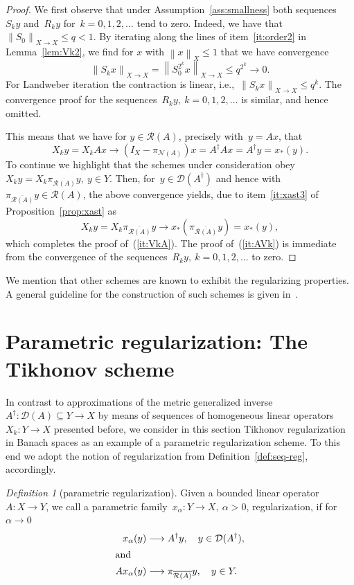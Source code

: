 \documentclass[12pt]{amsart}
\newcommand{\norm}[2]{\left\|#1\right\|_{#2}}
\newcommand{\lr}[1]{\left(#1\right)}
\newcommand{\domain}{\mathcal D}
\newcommand{\range}{\mathcal R}
\newcommand{\N}{\mathcal N}
\newcommand{\Ad}{A^\dag}
\newcommand{\xast}{x_\ast}
\newcommand{\pr}{\pi_{\overline{\range(A)}}}
\theoremstyle{remark}
\newtheorem{definition}{Definition}
\begin{document}
\begin{proof}
   We first observe that under Assumption~\ref{ass:smallness} both
  sequences~$S_{k}y$ and~$R_{k}y$ for~$k=0,1,2,\dots$ tend to zero.
  Indeed, we have that \linebreak $\norm{S_{0}}{X \to
   X}\leq q < 1$. By iterating along the lines of item~\eqref{it:order2} in Lemma~\ref{lem:Vk2}, we find for $x$ with $\norm{x}{X}\leq 1$ that we have convergence
 $$
\norm{S_{k}x}{X \to X} = \norm{S_{0}^{2^{k}}x}{X \to X}\leq q^{2
  ^{k}}\to 0.
$$
For Landweber iteration the contraction is linear, i.e.,\
$\norm{S_{k}x}{X \to X} \leq q^{k}$.
The convergence proof for the sequences~$R_{k}y,\ k=0,1,2,\dots$ is similar, and hence omitted.

\par

  This means that we have for $y\in\range(A)$, precisely with~$y=Ax$, that
  $$
  X_{k}y = X_{k}A x \longrightarrow \lr{I_{X} - \pi_{\N(A)}}x = \Ad Ax
  = \Ad y = \xast(y).
  $$
  To continue we highlight that the schemes under consideration
  obey $X_{k}y = X_{k}\pr y,\ y\in Y$.
  Then, for~$y\in\domain(\Ad)$ and hence with~$\pr y \in\range(A)$, the
  above convergence yields, due to item~\eqref{it:xast3} of
  Proposition~\ref{prop:xast} as
  $$
 X_{k}y = X_{k}\pr y \longrightarrow \xast(\pr y) = \xast(y),
 $$
 which completes the proof of~(\ref{it:VkA}). The proof
 of~(\ref{it:AVk}) is immediate from the convergence of the
 sequences~$R_{k}y,\ k=0,1,2,\dots$ to zero.
\end{proof}
We mention that other schemes are known to exhibit the regularizing
properties. A general guideline for the construction of such schemes
is given in~\cite[Thm.~3.13]{MR5022356}.

\section{Parametric regularization: The Tikhonov scheme}
\label{sec:tikhonov-scheme-as}
In contrast to approximations of the metric generalized inverse $A^\dagger: \domain(A) \subseteq Y \to X$ by means of sequences of homogeneous linear operators~$X_k: Y \to X$ presented before,
we consider in this section Tikhonov regularization in Banach spaces as an example of a parametric regularization scheme.
To this end we adopt the notion of regularization from
Definition~\ref{def:seq-reg}, accordingly.
\begin{definition}
  [parametric regularization]\label{def:parreg}
  Given a bounded linear operator~$A\colon X \to Y$, we call a
  parametric family~$x_{\alpha}\colon Y \to X,\ \alpha>0$, regularization, if for $\alpha \to 0$
  \begin{align}
   x_{\alpha}(y) &\longrightarrow \Ad y,\quad y\in \domain(\Ad)\label{it:xaA},\\
    \intertext{and}  A x_{\alpha}(y) &\longrightarrow \pi_{\overline{\range(A)}}
               y,\quad y\in Y\label{it:Axa}.
  \end{align}
\end{definition}
\end{document}
